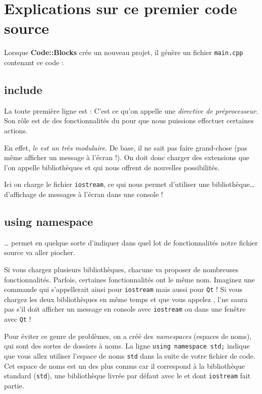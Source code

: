 \section{Explications sur ce premier code source}
Lorsque \textbf{Code::Blocks} crée un nouveau projet, il génère un fichier \lstinline|main.cpp| contenant ce code :



\subsection{include}
La toute première ligne est : 
C'est ce qu'on appelle une \emph{directive de préprocesseur}. Son rôle est de  des fonctionnalités du \cplus pour que nous puissions effectuer certaines actions.

En effet, \emph{le \cplus est un \lang très modulaire}. De base, il ne sait pas faire grand-chose (pas même afficher un message à l'écran !). On doit donc charger des extensions que l'on appelle bibliothèques et qui nous offrent de nouvelles possibilités.

Ici on charge le fichier \lstinline!iostream!, ce qui nous permet d'utiliser une bibliothèque… d'affichage de messages à l'écran dans une console !

\subsection{using namespace}
… permet en quelque sorte d'indiquer dans quel lot de fonctionnalités notre fichier source va aller piocher.

Si vous chargez plusieurs bibliothèques, chacune va proposer de nombreuses fonctionnalités. Parfois, certaines fonctionnalités ont le même nom. Imaginez une commande  qui s'appellerait ainsi pour \lstinline|iostream| mais aussi pour \lstinline|Qt| ! Si vous chargez les deux bibliothèques en même temps et que vous appelez , l'\ordi ne saura pas s'il doit afficher un message en console avec \lstinline|iostream| ou dans une fenêtre avec \lstinline|Qt| !

Pour éviter ce genre de problèmes, on a créé des \emph{namespaces} (espaces de noms), qui sont des sortes de dossiers à noms. La ligne \lstinline|using namespace std;| indique que vous allez utiliser l'espace de noms \lstinline|std| dans la suite de votre fichier de code. Cet espace de noms est un des plus connus car il correspond à la bibliothèque standard (\lstinline|std|), une bibliothèque livrée par défaut avec le \lang \cplus et dont \lstinline|iostream| fait partie.

